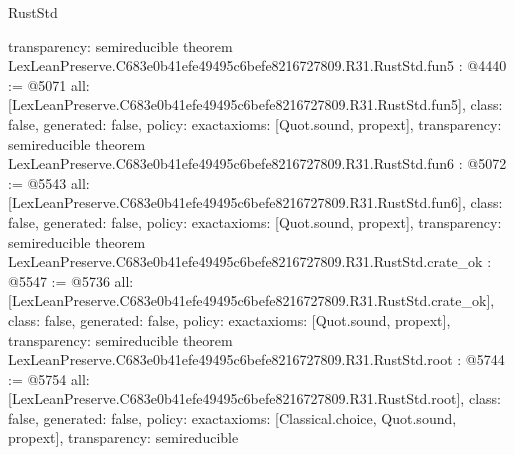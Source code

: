 \begin{lexlean}{RustStd}
\begin{coremodule}
{  transparency: semireducible
}
theorem LexLeanPreserve.C683e0b41efe49495c6befe8216727809.R31.RustStd.fun5 : @4440 := @5071 {
  all: [LexLeanPreserve.C683e0b41efe49495c6befe8216727809.R31.RustStd.fun5],
  class: false,
  generated: false,
  policy: exact{axioms: [Quot.sound, propext]},
  transparency: semireducible
}
theorem LexLeanPreserve.C683e0b41efe49495c6befe8216727809.R31.RustStd.fun6 : @5072 := @5543 {
  all: [LexLeanPreserve.C683e0b41efe49495c6befe8216727809.R31.RustStd.fun6],
  class: false,
  generated: false,
  policy: exact{axioms: [Quot.sound, propext]},
  transparency: semireducible
}
theorem LexLeanPreserve.C683e0b41efe49495c6befe8216727809.R31.RustStd.crate_ok : @5547 := @5736 {
  all: [LexLeanPreserve.C683e0b41efe49495c6befe8216727809.R31.RustStd.crate_ok],
  class: false,
  generated: false,
  policy: exact{axioms: [Quot.sound, propext]},
  transparency: semireducible
}
theorem LexLeanPreserve.C683e0b41efe49495c6befe8216727809.R31.RustStd.root : @5744 := @5754 {
  all: [LexLeanPreserve.C683e0b41efe49495c6befe8216727809.R31.RustStd.root],
  class: false,
  generated: false,
  policy: exact{axioms: [Classical.choice, Quot.sound, propext]},
  transparency: semireducible
}


\end{coremodule}
\end{lexlean}
